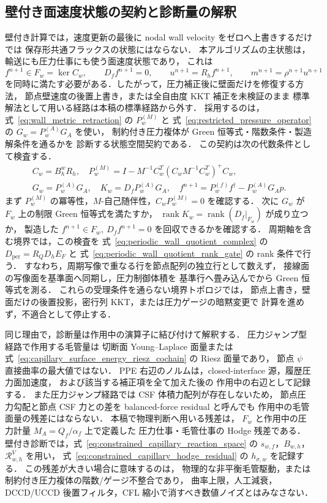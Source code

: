 \subsection{壁付き面速度状態の契約と診断量の解釈}
\label{sec:wall_face_state_algorithm_contract}

壁付き計算では，速度更新の最後に nodal wall velocity をゼロへ上書きするだけでは
保存形共通フラックスの状態にはならない．
本アルゴリズムの主状態は，輸送にも圧力仕事にも使う面速度状態であり，
これは
\[
  f^{n+1}\in F_w=\ker C_w,\qquad D_ff^{n+1}=0,
  \qquad u^{n+1}=R_hf^{n+1},\qquad m^{n+1}=\rho^{n+1}u^{n+1}
\]
を同時に満たす必要がある．したがって，圧力補正後に壁面だけを修復する方法，
節点壁速度の後置上書き，または全自由度 KKT 補正を未検証のまま
標準解法として用いる経路は本稿の標準経路から外す．
採用するのは，式~\eqref{eq:wall_metric_retraction} の $P_w^{(M)}$ と
式~\eqref{eq:restricted_pressure_operator} の $G_w=P_w^{(A)}G_A$ を使い，
制約付き圧力複体が Green 恒等式・階数条件・製造解条件を通るかを
診断する状態空間契約である．
この契約は次の代数条件として検査する．
\[
\begin{gathered}
  C_w=B_h^wR_h,\quad
  P_w^{(M)}=
  I-M^{-1}C_w^T(C_wM^{-1}C_w^T)^+C_w,\\
  G_w=P_w^{(A)}G_A,\quad
  K_w=D_fP_w^{(A)}G_A,\quad
  f^{n+1}=P_w^{(f)}f^\dagger-P_w^{(A)}G_Ap .
\end{gathered}
\]
まず $P_w^{(M)}$ の冪等性，$M$-自己随伴性，$C_wP_w^{(M)}=0$ を確認する．
次に $G_w$ が $F_w$ 上の制限 Green 恒等式を満たすか，
$\operatorname{rank}K_w=\operatorname{rank}(D_f|_{F_w})$ が成り立つか，
製造した $f^{n+1}\in F_w,\ D_ff^{n+1}=0$ を回収できるかを確認する．
周期軸を含む境界では，この検査を
式~\eqref{eq:periodic_wall_quotient_complex} の
$D_{\mathrm{per}}=R_QD_hE_F$ と
式~\eqref{eq:periodic_wall_quotient_rank_gate} の rank 条件で行う．
すなわち，周期写像で重なる行を節点配列の独立行として数えず，
接線面の写像面を基準面へ同期し，圧力制御体積を
基準行へ畳み込んでから Green 恒等式を測る．
これらの受理条件を通らない境界トポロジでは，
節点上書き，壁面だけの後置投影，密行列 KKT，または圧力ゲージの暗黙変更で
計算を進めず，不適合として停止する．

同じ理由で，診断量は作用中の演算子に結び付けて解釈する．
圧力ジャンプ型経路で作用する毛管量は
切断面 Young--Laplace 面量または
式~\eqref{eq:capillary_surface_energy_riesz_cochain} の Riesz 面量であり，
節点 $\psi$ 直接曲率の最大値ではない．
PPE 右辺のノルムは，closed-interface 源，履歴圧力面加速度，
および該当する補正項を全て加えた後の
作用中の右辺として記録する．
また圧力ジャンプ経路では CSF 体積力配列が存在しないため，
節点圧力勾配と節点 CSF 力との差を balanced-force residual と呼んでも
作用中の毛管面量の残差にはならない．
本稿で物理判断へ用いる残差は，
$F_w$ と作用中の圧力計量 $M_A=Q_f/\alpha_f$ 上で定義した
圧力仕事・毛管仕事の Hodge 残差である．
壁付き診断では，式~\eqref{eq:constrained_capillary_reaction_space} の
$s_{w,f}$，$B_{w,h}$，$\mathcal{R}^{V}_{w,h}$ を用い，
式~\eqref{eq:constrained_capillary_hodge_residual} の
$h_{\sigma,w}$ を記録する．
この残差が大きい場合に意味するのは，
物理的な非平衡毛管駆動，または制約付き圧力複体の階数/ゲージ不整合であり，
曲率上限，人工減衰，DCCD/UCCD 後置フィルタ，CFL 縮小で消すべき数値ノイズとはみなさない．

